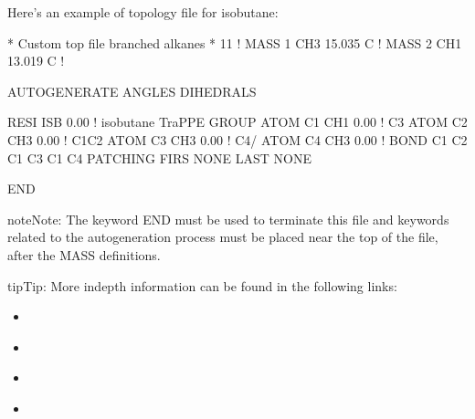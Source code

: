 \documentclass[letterpaper,10pt,english]{sphinxmanual}
\begin{document}
Here’s an example of topology file for isobutane:

\begin{sphinxVerbatim}[commandchars=\\\{\}]
* Custom top file \PYGZhy{}\PYGZhy{} branched alkanes *
11
!
MASS 1 CH3 15.035 C !
MASS 2 CH1 13.019 C !

AUTOGENERATE ANGLES DIHEDRALS

RESI ISB    0.00 !  isobutane \PYGZhy{} TraPPE
GROUP
ATOM  C1  CH1   0.00 !  C3\PYGZbs{}
ATOM  C2  CH3   0.00 !     C1\PYGZhy{}C2
ATOM  C3  CH3   0.00 !  C4/
ATOM  C4  CH3   0.00 !
BOND  C1  C2  C1  C3  C1  C4
PATCHING FIRS NONE LAST NONE

END
\end{sphinxVerbatim}

\begin{sphinxadmonition}{note}{Note:}
The keyword END must be used to terminate this file and keywords related to the auto\sphinxhyphen{}generation process must be placed near the top of the file, after the MASS definitions.
\end{sphinxadmonition}

\begin{sphinxadmonition}{tip}{Tip:}
More in\sphinxhyphen{}depth information can be found in the following links:
\begin{itemize}
\item {} 

\end{itemize}
\begin{itemize}
\item {} 

\end{itemize}
\begin{itemize}
\item {} 

\end{itemize}
\begin{itemize}
\item {} 

\end{itemize}
\end{sphinxadmonition}
\end{document}
